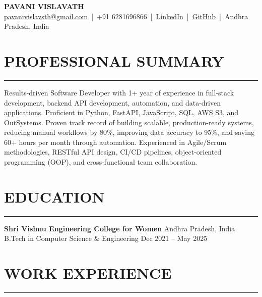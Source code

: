 \documentclass[10pt,a4paper]{article}
\newcommand{\sectionline}{
\vspace{-2pt}
\hrule
\vspace{4pt}
}
\begin{document}
\small

\begin{center}
{\Large \textbf{PAVANI VISLAVATH}}\\[2pt]
\href{mailto:pavanivislavsth@gmail.com}{pavanivislavsth@gmail.com}
\,|\, +91 6281696866
\,|\, \href{https://linkedin.com/in/pavani-vislavath-119180265}{LinkedIn}
\,|\, \href{https://github.com/21b01a05j2}{GitHub}
\,|\, Andhra Pradesh, India
\end{center}

\vspace{4pt}

\section*{PROFESSIONAL SUMMARY}
\sectionline
Results-driven Software Developer with 1+ year of experience in full-stack development, backend API development, automation, and data-driven applications. Proficient in Python, FastAPI, JavaScript, SQL, AWS S3, and OutSystems. Proven track record of building scalable, production-ready systems, reducing manual workflows by 80\%, improving data accuracy to 95\%, and saving 60+ hours per month through automation. Experienced in Agile/Scrum methodologies, RESTful API design, CI/CD pipelines, object-oriented programming (OOP), and cross-functional team collaboration.

\section*{EDUCATION}
\sectionline
\textbf{Shri Vishnu Engineering College for Women} \hfill Andhra Pradesh, India\\
B.Tech in Computer Science \& Engineering \hfill Dec 2021 -- May 2025

\section*{WORK EXPERIENCE}
\sectionline
\end{document}
